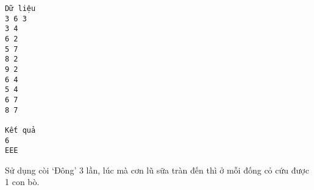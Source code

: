 \begin{verbatim}
Dữ liệu
3 6 3
3 4
6 2
5 7
8 2
9 2
6 4
5 4
6 7
8 7

Kết quả
6
EEE
\end{verbatim}
Sử dụng còi ‘Đông’ 3 lần, lúc mà cơn lũ sữa tràn đến  thì ở mỗi đống cỏ cứu được 1 con bò.